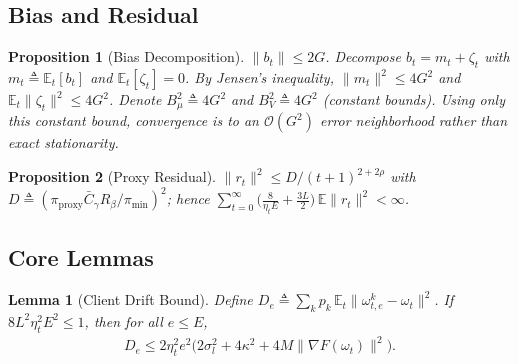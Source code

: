 \documentclass[journal]{IEEEtran}
\newtheorem{lemma}{Lemma}
\newtheorem{proposition}{Proposition}
\begin{document}
\subsection{Bias and Residual}

\begin{proposition}[Bias Decomposition]\label{prop:3}
  \(\|b_t\| \le 2G\). Decompose \(b_t = m_t + \zeta_t\) with
  \(m_t \triangleq \mathbb E_t[b_t]\) and \(\mathbb E_t[\zeta_t] = 0\).
  By Jensen's inequality,
  \(\|m_t\|^2 \le 4G^2\) and \(\mathbb E_t\|\zeta_t\|^2 \le 4G^2\).
  Denote \(B_\mu^2 \triangleq 4G^2\) and \(B_V^2 \triangleq 4G^2\) (constant bounds).
  Using only this constant bound, convergence is to an \(\mathcal O(G^2)\) error neighborhood rather than exact stationarity.
\end{proposition}

\begin{proposition}[Proxy Residual]\label{prop:4}
  \(\|r_t\|^2 \le D/(t+1)^{2+2\rho}\) with \(D \triangleq (\pi_{\mathrm{proxy}}\bar C_\gamma R_\beta / \pi_{\min})^{2}\);
  hence \(\sum_{t=0}^{\infty}\bigl(\frac{8}{\eta_t E} + \frac{3L}{2}\bigr)\,\mathbb E\|r_t\|^2 < \infty\).
\end{proposition}

\subsection{Core Lemmas}

\begin{lemma}[Client Drift Bound]\label{lem:1}
  Define \(D_e \triangleq \sum_k p_k\,\mathbb E_t\|\omega_{t,e}^k - \omega_t\|^2\).
  If \(8L^2\eta_t^2 E^2 \le 1\), then for all \(e \le E\),
  \begin{align}
    D_e \le 2\eta_t^2 e^2\bigl(2\sigma_l^2 + 4\kappa^2 + 4M\|\nabla F(\omega_t)\|^2\bigr).
    \label{eq:26}
  \end{align}
\end{lemma}
\end{document}
